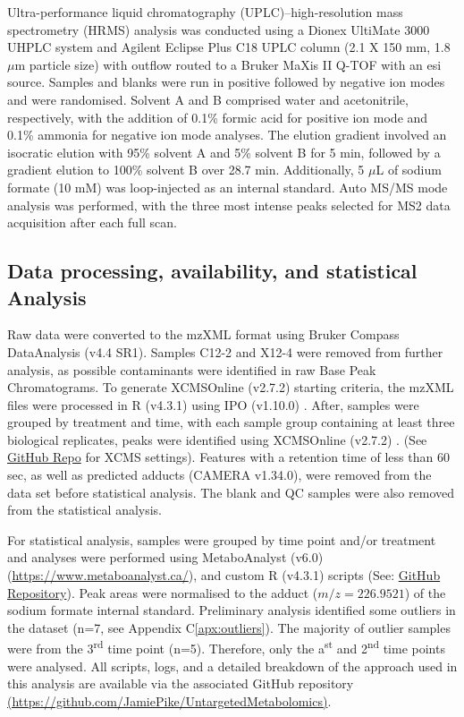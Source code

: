 Ultra-performance liquid chromatography (UPLC)–high-resolution mass spectrometry (HRMS) analysis was conducted using a Dionex UltiMate 3000 UHPLC system and Agilent Eclipse Plus C18 UPLC column (2.1 X 150 mm, 1.8 \(\mu\)m particle size) with outflow routed to a Bruker MaXis II Q-TOF with an \ac{esi} source. Samples and blanks were run in positive followed by negative ion modes and were randomised. Solvent A and B comprised water and acetonitrile, respectively, with the addition of 0.1\% formic acid for positive ion mode and 0.1\% ammonia for negative ion mode analyses. The elution gradient involved an isocratic elution with 95\% solvent A and 5\% solvent B for 5 min, followed by a gradient elution to 100\% solvent B over 28.7 min. Additionally, 5 \(\mu\)L of sodium formate (10 mM) was loop-injected as an internal standard. Auto MS/MS mode analysis was performed, with the three most intense peaks selected for MS2 data acquisition after each full scan.

\subsection{Data processing, availability, and statistical Analysis}
\label{sec:XCMS}
Raw data were converted to the mzXML format using Bruker Compass DataAnalysis (v4.4 SR1). Samples C12-2 and X12-4 were removed from further analysis, as possible contaminants were identified in raw Base Peak Chromatograms. To generate XCMSOnline (v2.7.2) \parencite{Gowda2014} starting criteria, the mzXML files were processed in R (v4.3.1) \parencite{R} using IPO (v1.10.0) \parencite{Libiseller2015}. After, samples were grouped by treatment and time, with each sample group containing at least three biological replicates, peaks were identified using XCMSOnline (v2.7.2) \parencite{Gowda2014}. (See \href{https://github.com/JamiePike/UntargetedMetabolomics/tree/main/NovDec22/XCMS}{GitHub Repo} for XCMS settings). Features with a retention time of less than 60 sec, as well as predicted adducts (CAMERA v1.34.0), were removed from the data set before statistical analysis. The blank and QC samples were also removed from the statistical analysis.

For statistical analysis, samples were grouped by time point and/or treatment and analyses were performed using MetaboAnalyst (v6.0) (\href{https://www.metaboanalyst.ca/}{https://www.metaboanalyst.ca/}), and custom R (v4.3.1) \parencite{R} scripts (See: \href{https://github.com/JamiePike/UntargetedMetabolomics/tree/main}{GitHub Repository}). Peak areas were normalised to the   adduct ($m/z=226.9521$) of the sodium formate internal standard.  Preliminary analysis identified some outliers in the dataset (n=7, see Appendix C\ref{apx:outliers}). The majority of outlier samples were from the 3\textsuperscript{rd} time point (n=5). Therefore, only the a\textsuperscript{st} and 2\textsuperscript{nd} time points were analysed. All scripts, logs, and a detailed breakdown of the approach used in this analysis are available via the associated GitHub repository \href{https://github.com/JamiePike/UntargetedMetabolomics}{ (https://github.com/JamiePike/UntargetedMetabolomics)}. 

